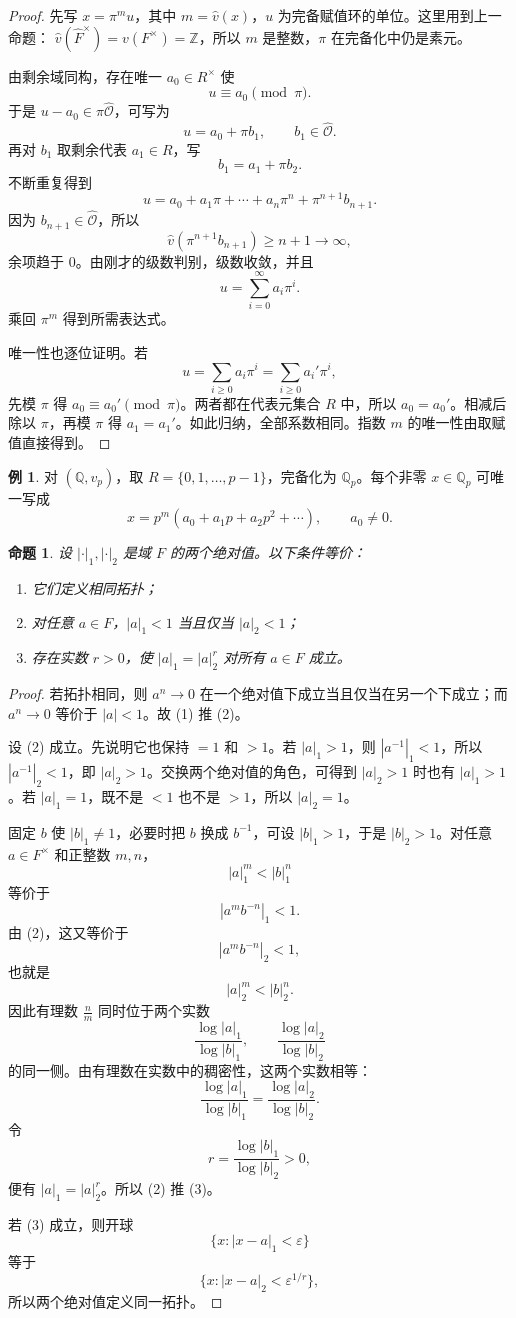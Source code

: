 \documentclass[11pt,a4paper,openany]{ctexbook}
\numberwithin{equation}{chapter}
\newcommand{\Q}{\mathbb{Q}}
\newcommand{\Z}{\mathbb{Z}}
\theoremstyle{plain}
\newtheorem{proposition}[theorem]{命题}
\theoremstyle{definition}
\newtheorem{example}[theorem]{例}
\theoremstyle{remark}
\begin{document}
\begin{proof}
先写 $x=\pi^m u$，其中 $m=\widehat v(x)$，$u$ 为完备赋值环的单位。这里用到上一命题：
\(\widehat v(\widehat F^\times)=v(F^\times)=\Z\)，所以 $m$ 是整数，$\pi$ 在完备化中仍是素元。

由剩余域同构，存在唯一 $a_0\in R^\times$ 使
\[
u\equiv a_0\pmod{\pi}.
\]
于是 $u-a_0\in\pi\widehat{\mathcal O}$，可写为
\[
u=a_0+\pi b_1,\qquad b_1\in\widehat{\mathcal O}.
\]
再对 $b_1$ 取剩余代表 $a_1\in R$，写
\[
b_1=a_1+\pi b_2.
\]
不断重复得到
\[
u=a_0+a_1\pi+\cdots+a_n\pi^n+\pi^{n+1}b_{n+1}.
\]
因为 $b_{n+1}\in\widehat{\mathcal O}$，所以
\[
\widehat v(\pi^{n+1}b_{n+1})\ge n+1\to\infty,
\]
余项趋于 $0$。由刚才的级数判别，级数收敛，并且
\[
u=\sum_{i=0}^\infty a_i\pi^i.
\]
乘回 $\pi^m$ 得到所需表达式。

唯一性也逐位证明。若
\[
u=\sum_{i\ge0}a_i\pi^i=\sum_{i\ge0}a_i'\pi^i,
\]
先模 $\pi$ 得 $a_0\equiv a_0'\pmod{\pi}$。两者都在代表元集合 $R$ 中，所以
$a_0=a_0'$。相减后除以 $\pi$，再模 $\pi$ 得 $a_1=a_1'$。如此归纳，全部系数相同。指数 $m$ 的唯一性由取赋值直接得到。
\end{proof}

\begin{example}
对 $(\Q,v_p)$，取 $R=\{0,1,\dots,p-1\}$，完备化为 $\Q_p$。每个非零 $x\in\Q_p$ 可唯一写成
\[
x=p^m(a_0+a_1p+a_2p^2+\cdots),\qquad a_0\ne0.
\]
\end{example}

\begin{proposition}
设 $|\cdot|_1,|\cdot|_2$ 是域 $F$ 的两个绝对值。以下条件等价：
\begin{enumerate}[label=(\arabic*)]
\item 它们定义相同拓扑；
\item 对任意 $a\in F$，$|a|_1<1$ 当且仅当 $|a|_2<1$；
\item 存在实数 $r>0$，使 $|a|_1=|a|_2^r$ 对所有 $a\in F$ 成立。
\end{enumerate}
\end{proposition}

\begin{proof}
若拓扑相同，则 $a^n\to0$ 在一个绝对值下成立当且仅当在另一个下成立；而 $a^n\to0$ 等价于 $|a|<1$。故 (1) 推 (2)。

设 (2) 成立。先说明它也保持 $=1$ 和 $>1$。若 $|a|_1>1$，则
$|a^{-1}|_1<1$，所以 $|a^{-1}|_2<1$，即 $|a|_2>1$。交换两个绝对值的角色，可得到
$|a|_2>1$ 时也有 $|a|_1>1$。若
$|a|_1=1$，既不是 $<1$ 也不是 $>1$，所以 $|a|_2=1$。

固定 $b$ 使 $|b|_1\ne1$，必要时把 $b$ 换成 $b^{-1}$，可设
$|b|_1>1$，于是 $|b|_2>1$。对任意 $a\in F^\times$ 和正整数 $m,n$，
\[
|a|_1^m<|b|_1^n
\]
等价于
\[
|a^m b^{-n}|_1<1.
\]
由 (2)，这又等价于
\[
|a^m b^{-n}|_2<1,
\]
也就是
\[
|a|_2^m<|b|_2^n.
\]
因此有理数 $\frac nm$ 同时位于两个实数
\[
\frac{\log|a|_1}{\log|b|_1},\qquad
\frac{\log|a|_2}{\log|b|_2}
\]
的同一侧。由有理数在实数中的稠密性，这两个实数相等：
\[
\frac{\log|a|_1}{\log|b|_1}
=
\frac{\log|a|_2}{\log|b|_2}.
\]
令
\[
r=\frac{\log|b|_1}{\log|b|_2}>0,
\]
便有 $|a|_1=|a|_2^r$。所以 (2) 推 (3)。

若 (3) 成立，则开球
\[
\{x:|x-a|_1<\varepsilon\}
\]
等于
\[
\{x:|x-a|_2<\varepsilon^{1/r}\},
\]
所以两个绝对值定义同一拓扑。
\end{proof}
\end{document}
